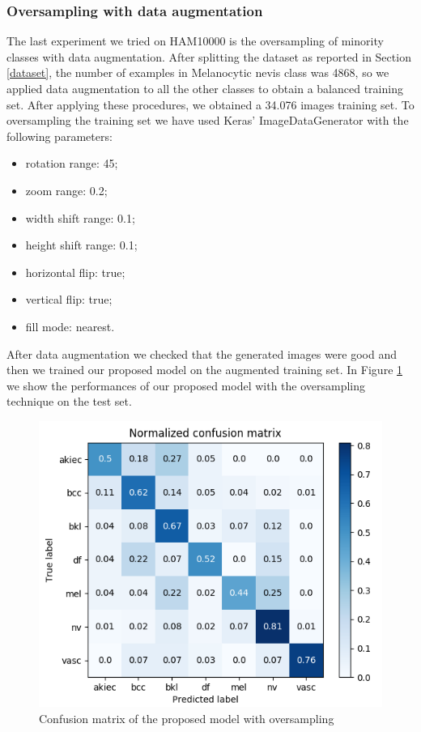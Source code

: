 	\subsubsection{Oversampling with data augmentation}
	
		The last experiment we tried on HAM10000 is the oversampling of minority classes with data augmentation. After splitting the dataset as reported in Section \ref{dataset}, the number of examples in Melanocytic nevis class was 4868, so we applied data augmentation to all the other classes to obtain a balanced training set. After applying these procedures, we obtained a 34.076 images training set.
		To oversampling the training set we have used Keras' ImageDataGenerator with the following parameters:
		\begin{itemize}
			\item rotation range: 45; 
			\item zoom range: 0.2; 
			\item width shift range: 0.1;
			\item height shift range: 0.1;
			\item horizontal flip: true; 
			\item vertical flip: true;
			\item fill mode: nearest.
		\end{itemize}
		
		After data augmentation we checked that the generated images were good and then we trained our proposed model on the augmented training set.
		In Figure \ref{fig:third-matrix} we show the performances of our proposed model with the oversampling technique on the test set.
		
		\begin{figure}[H]
			\centering
			\includegraphics[width=13cm]{images/thirdMatrix.png}
			\caption{Confusion matrix of the proposed model with oversampling}
			\label{fig:third-matrix}
		\end{figure}
		
